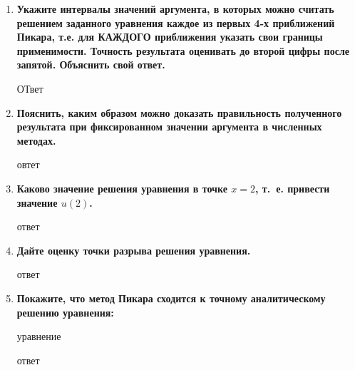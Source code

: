 \begin{enumerate}[label=\textbf{\arabic*})]
    \item \textbf{Укажите интервалы значений аргумента, в которых можно считать решением
        заданного уравнения каждое из первых 4-х приближений Пикара, т.е. для
        КАЖДОГО приближения указать свои границы применимости. Точность
        результата оценивать до второй цифры после запятой. Объяснить свой
        ответ.}

        ОТвет

    \item \textbf{Пояснить, каким образом можно доказать правильность полученного
        результата при фиксированном значении аргумента в численных методах.}

        овтет

    \item \textbf{Каково значение решения уравнения в точке $x=2$, т.~е. привести значение
        $u(2)$.}

        ответ

    \item \textbf{Дайте оценку точки разрыва решения уравнения.}

       ответ

    \item \textbf{Покажите, что метод Пикара сходится к точному аналитическому решению
        уравнения:}

        уравнение

        ответ
\end{enumerate}
